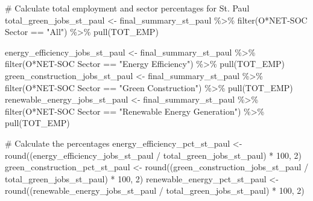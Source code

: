 \documentclass[
  letterpaper,
  DIV=11,
  numbers=noendperiod]{scrartcl}
\newenvironment{Shaded}{\begin{snugshade}}{\end{snugshade}}
\newcommand{\AttributeTok}[1]{\textcolor[rgb]{0.40,0.45,0.13}{#1}}
\newcommand{\CommentTok}[1]{\textcolor[rgb]{0.37,0.37,0.37}{#1}}
\newcommand{\DecValTok}[1]{\textcolor[rgb]{0.68,0.00,0.00}{#1}}
\newcommand{\FunctionTok}[1]{\textcolor[rgb]{0.28,0.35,0.67}{#1}}
\newcommand{\NormalTok}[1]{\textcolor[rgb]{0.00,0.23,0.31}{#1}}
\newcommand{\OtherTok}[1]{\textcolor[rgb]{0.00,0.23,0.31}{#1}}
\newcommand{\SpecialCharTok}[1]{\textcolor[rgb]{0.37,0.37,0.37}{#1}}
\newcommand{\StringTok}[1]{\textcolor[rgb]{0.13,0.47,0.30}{#1}}
\begin{document}
\begin{Shaded}
\begin{Highlighting}[]
\CommentTok{\# Calculate total employment and sector percentages for St. Paul}
\NormalTok{total\_green\_jobs\_st\_paul }\OtherTok{\textless{}{-}}\NormalTok{ final\_summary\_st\_paul }\SpecialCharTok{\%\textgreater{}\%} \FunctionTok{filter}\NormalTok{(}\StringTok{\textasciigrave{}}\AttributeTok{O*NET{-}SOC Sector}\StringTok{\textasciigrave{}} \SpecialCharTok{==} \StringTok{"All"}\NormalTok{) }\SpecialCharTok{\%\textgreater{}\%} \FunctionTok{pull}\NormalTok{(TOT\_EMP)}

\NormalTok{energy\_efficiency\_jobs\_st\_paul }\OtherTok{\textless{}{-}}\NormalTok{ final\_summary\_st\_paul }\SpecialCharTok{\%\textgreater{}\%} \FunctionTok{filter}\NormalTok{(}\StringTok{\textasciigrave{}}\AttributeTok{O*NET{-}SOC Sector}\StringTok{\textasciigrave{}} \SpecialCharTok{==} \StringTok{"Energy Efficiency"}\NormalTok{) }\SpecialCharTok{\%\textgreater{}\%} \FunctionTok{pull}\NormalTok{(TOT\_EMP)}
\NormalTok{green\_construction\_jobs\_st\_paul }\OtherTok{\textless{}{-}}\NormalTok{ final\_summary\_st\_paul }\SpecialCharTok{\%\textgreater{}\%} \FunctionTok{filter}\NormalTok{(}\StringTok{\textasciigrave{}}\AttributeTok{O*NET{-}SOC Sector}\StringTok{\textasciigrave{}} \SpecialCharTok{==} \StringTok{"Green Construction"}\NormalTok{) }\SpecialCharTok{\%\textgreater{}\%} \FunctionTok{pull}\NormalTok{(TOT\_EMP)}
\NormalTok{renewable\_energy\_jobs\_st\_paul }\OtherTok{\textless{}{-}}\NormalTok{ final\_summary\_st\_paul }\SpecialCharTok{\%\textgreater{}\%} \FunctionTok{filter}\NormalTok{(}\StringTok{\textasciigrave{}}\AttributeTok{O*NET{-}SOC Sector}\StringTok{\textasciigrave{}} \SpecialCharTok{==} \StringTok{"Renewable Energy Generation"}\NormalTok{) }\SpecialCharTok{\%\textgreater{}\%} \FunctionTok{pull}\NormalTok{(TOT\_EMP)}

\CommentTok{\# Calculate the percentages}
\NormalTok{energy\_efficiency\_pct\_st\_paul }\OtherTok{\textless{}{-}} \FunctionTok{round}\NormalTok{((energy\_efficiency\_jobs\_st\_paul }\SpecialCharTok{/}\NormalTok{ total\_green\_jobs\_st\_paul) }\SpecialCharTok{*} \DecValTok{100}\NormalTok{, }\DecValTok{2}\NormalTok{)}
\NormalTok{green\_construction\_pct\_st\_paul }\OtherTok{\textless{}{-}} \FunctionTok{round}\NormalTok{((green\_construction\_jobs\_st\_paul }\SpecialCharTok{/}\NormalTok{ total\_green\_jobs\_st\_paul) }\SpecialCharTok{*} \DecValTok{100}\NormalTok{, }\DecValTok{2}\NormalTok{)}
\NormalTok{renewable\_energy\_pct\_st\_paul }\OtherTok{\textless{}{-}} \FunctionTok{round}\NormalTok{((renewable\_energy\_jobs\_st\_paul }\SpecialCharTok{/}\NormalTok{ total\_green\_jobs\_st\_paul) }\SpecialCharTok{*} \DecValTok{100}\NormalTok{, }\DecValTok{2}\NormalTok{)}


\end{Highlighting}
\end{Shaded}
\end{document}
